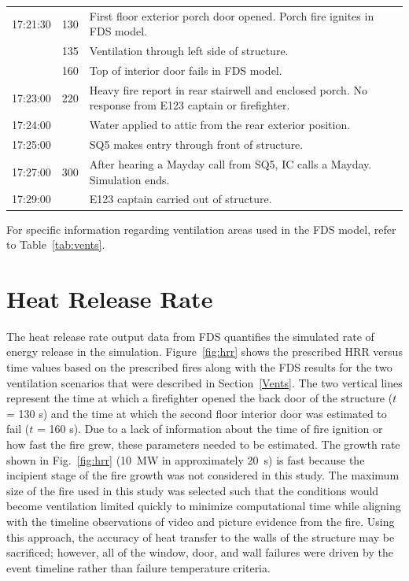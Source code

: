 \documentclass[12pt,oneside]{book}
\begin{document}
\begin{table}
\begin{tabular}{ccl}
\multirow{2}{*}{17:21:30} & \multirow{2}{*}{130} &  \multirow{2}{*}{\parbox{8cm}{First floor exterior porch door opened. Porch fire ignites in FDS model.}} \\
        &  & \\[.25cm]
        & 135 & Ventilation through left side of structure. \\[.25cm] 
        & 160 & Top of interior door fails in FDS model. \\[.25cm] 
\multirow{3}{*}{17:23:00}    & \multirow{3}{*}{220} & \multirow{3}{*}{\parbox{8cm} {Heavy fire report in rear stairwell and enclosed porch. No response from E123 captain or firefighter.}} \\
         & & \\[.25cm]
         & & \\[.25cm]  
17:24:00    &   & Water applied to attic from the rear exterior position. \\[.25cm]
17:25:00    &   & SQ5 makes entry through front of structure. \\[.25cm]
\multirow{2}{*}{17:27:00}    & \multirow{2}{*}{300}  & \multirow{2}{*}{\parbox{8cm} {After hearing a Mayday call from SQ5, IC calls a Mayday. Simulation ends.}}\\
         & &  \\[.25cm]
17:29:00    &   & E123 captain carried out of structure. \\
\bottomrule[1.25pt]
\end{tabular}\par
\footnotesize
For specific information regarding ventilation areas used in the FDS model, refer to Table~\ref{tab:vents}.
\normalsize
\end{table}


\section{Heat Release Rate}
\label{HRR}
The heat release rate output data from FDS quantifies the simulated rate of energy release in the simulation. Figure~\ref{fig:hrr} shows the prescribed HRR versus time values based on the prescribed fires along with the FDS results for the two ventilation scenarios that were described in Section~\ref{Vents}. The two vertical lines represent the time at which a firefighter opened the back door of the structure ($t$ = 130 s) and the time at which the second floor interior door was estimated to fail ($t$ = 160 s). Due to a lack of information about the time of fire ignition or how fast the fire grew, these parameters needed to be estimated.  The growth rate shown in Fig.~\ref{fig:hrr} (10~MW in approximately 20~s) is fast because the incipient stage of the fire growth was not considered in this study. The maximum size of the fire used in this study was selected such that the conditions would become ventilation limited quickly to minimize computational time while aligning with the timeline observations of video and picture evidence from the fire. Using this approach, the accuracy of heat transfer to the walls of the structure may be sacrificed; however, all of the window, door, and wall failures were driven by the event timeline rather than failure temperature criteria.
\end{document}
